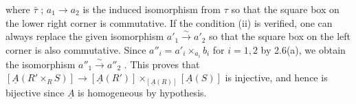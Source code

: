 where  $\bar{\tau}$ ; $a_{1} \to a_{2}$  is the induced isomorphism from  $\tau$  so that the square box on the lower right corner is commutative. If the condition (ii) is verified, one can always replace the given isomorphism  $a'_{1} \overset{\sim}{\to} a'_{2}$  so that the square box on the left corner is also commutative. Since  $a''_{i} = a'_{i} \times_{a_{i}} b_{i}$  for  $i = 1, 2$  by  2.6(a), we obtain the isomorphism  $a''_{1} \overset{\sim}{\to} a''_{2}$  . This proves that  $[\underline{A}(R' \times_{R} S)] \longrightarrow [\underline{A}(R')] \times_{[\underline{A}(R)]} [\underline{A}(S)]$  is injective, and hence is bijective since  $\underline{A}$  is homogeneous by hypothesis.

